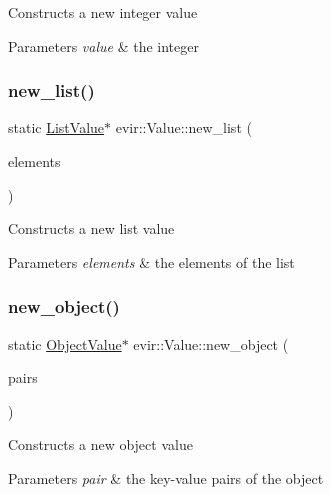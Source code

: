 Constructs a new integer value 
\begin{DoxyParams}{Parameters}
{\em value} & the integer \\
\hline
\end{DoxyParams}
\mbox{\label{classevir_1_1Value_a0936d4b3ac1b972fc784dc6b71ca0ca2}} 
\subsubsection{\texorpdfstring{new\+\_\+list()}{new\_list()}}
{\footnotesize\ttfamily static \hyperlink{classevir_1_1ListValue}{List\+Value}$\ast$ evir\+::\+Value\+::new\+\_\+list (\begin{DoxyParamCaption}\item[{vector$<$ \hyperlink{classevir_1_1Value}{Value} $\ast$$>$}]{elements }\end{DoxyParamCaption})\hspace{0.3cm}{\ttfamily [static]}}

Constructs a new list value 
\begin{DoxyParams}{Parameters}
{\em elements} & the elements of the list \\
\hline
\end{DoxyParams}
\mbox{\label{classevir_1_1Value_a4afc4919cf8f686d97a8f59ea7719ac1}} 
\subsubsection{\texorpdfstring{new\+\_\+object()}{new\_object()}}
{\footnotesize\ttfamily static \hyperlink{classevir_1_1ObjectValue}{Object\+Value}$\ast$ evir\+::\+Value\+::new\+\_\+object (\begin{DoxyParamCaption}\item[{map$<$ \hyperlink{classevir_1_1Value}{Value} $\ast$C\+O\+M\+MA \hyperlink{classevir_1_1Value}{Value} $\ast$$>$}]{pairs }\end{DoxyParamCaption})\hspace{0.3cm}{\ttfamily [static]}}

Constructs a new object value 
\begin{DoxyParams}{Parameters}
{\em pair} & the key-\/value pairs of the object \\
\hline
\end{DoxyParams}
\mbox{\label{classevir_1_1Value_af0e8e17cc7ab9c0907ba4c8994ef169a}} 
